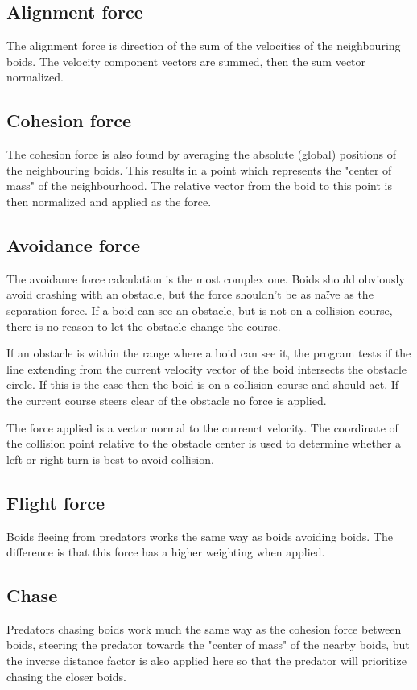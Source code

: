 \subsection*{Alignment force}
The alignment force is direction of the sum of the velocities of the neighbouring boids.
The velocity component vectors are summed, then the sum vector normalized.

\subsection*{Cohesion force}
The cohesion force is also found by averaging the absolute (global) positions of the neighbouring boids.
This results in a point which represents the "center of mass" of the neighbourhood.
The relative vector from the boid to this point is then normalized and applied as the force.

\subsection*{Avoidance force}
The avoidance force calculation is the most complex one.
Boids should obviously avoid crashing with an obstacle,
but the force shouldn't be as naïve as the separation force.
If a boid can see an obstacle, but is not on a collision course, there is no reason to let the obstacle change the course.

If an obstacle is within the range where a boid can see it,
the program tests if the line extending from the current velocity vector of the boid intersects the obstacle circle.
If this is the case then the boid is on a collision course and should act.
If the current course steers clear of the obstacle no force is applied.

The force applied is a vector normal to the currenct velocity.
The coordinate of the collision point relative to the obstacle center is used to determine whether a left or right turn is best to avoid collision.

\subsection*{Flight force}
Boids fleeing from predators works the same way as boids avoiding boids.
The difference is that this force has a higher weighting when applied.

\subsection*{Chase}
Predators chasing boids work much the same way as the cohesion force between boids,
steering the predator towards the "center of mass" of the nearby boids,
but the inverse distance factor is also applied here so that the predator will prioritize chasing the closer boids.

